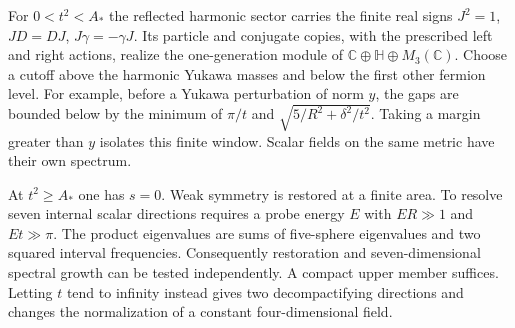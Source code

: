 \documentclass[aps,prd,reprint,onecolumn,nofootinbib,amsmath,amssymb]{revtex4-2}
\begin{document}
For $0<t^2<A_*$ the reflected harmonic sector carries the finite real signs $J^2=1$, $JD=DJ$, $J\gamma=-\gamma J$. Its particle and conjugate copies, with the prescribed left and right actions, realize the one-generation module of $\mathbb C\oplus\mathbb H\oplus M_3(\mathbb C)$. Choose a cutoff above the harmonic Yukawa masses and below the first other fermion level. For example, before a Yukawa perturbation of norm $y$, the gaps are bounded below by the minimum of $\pi/t$ and $\sqrt{5/R^2+\delta^2/t^2}$. Taking a margin greater than $y$ isolates this finite window. Scalar fields on the same metric have their own spectrum.

At $t^2\ge A_*$ one has $s=0$. Weak symmetry is restored at a finite area. To resolve seven internal scalar directions requires a probe energy $E$ with $ER\gg1$ and $Et\gg\pi$. The product eigenvalues are sums of five-sphere eigenvalues and two squared interval frequencies. Consequently restoration and seven-dimensional spectral growth can be tested independently. A compact upper member suffices. Letting $t$ tend to infinity instead gives two decompactifying directions and changes the normalization of a constant four-dimensional field.
\end{document}
